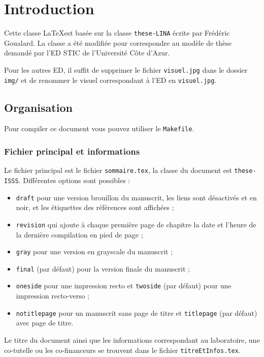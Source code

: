 
\chapter{Introduction}

Cette classe \LaTeX est basée sur la classe \texttt{these-LINA} écrite par Frédéric Goualard. La classe a été modifiée pour correspondre au modèle de thèse demandé par l'ED STIC de l'Université Côte d'Azur.

Pour les autres ED, il suffit de supprimer le fichier \texttt{visuel.jpg} dans le dossier \texttt{img/} et de renommer le visuel correspondant à l'ED en \texttt{visuel.jpg}.

\section{Organisation}
  
  Pour compiler ce document vous pouvez utiliser le \texttt{Makefile}.

  \subsection{Fichier principal et informations}
  Le fichier principal est le fichier \texttt{sommaire.tex}, la classe du document est \texttt{these-ISSS}. 
  Différentes options sont possibles :
  \begin{itemize}
    \item \texttt{draft} pour une version brouillon du manuscrit, les liens sont désactivés et en noir, et les étiquettes des références sont affichées ;
    \item \texttt{revision} qui ajoute à chaque première page de chapitre la date et l'heure de la dernière compilation en pied de page ;
    \item \texttt{gray} pour une version en grayscale du manuscrit ;
    \item \texttt{final} (par défaut) pour la version finale du manuscrit ;
    \item \texttt{oneside} pour une impression recto et \texttt{twoside} (par défaut) pour une impression recto-verso ;
    \item \texttt{notitlepage} pour un manuscrit sans page de titre et \texttt{titlepage} (par défaut) avec page de titre.
  \end{itemize}
  
  Le titre du document ainsi que les informations correspondant au laboratoire, une co-tutelle ou les co-financeurs se trouvent dans le fichier \texttt{titreEtInfos.tex}.
  
